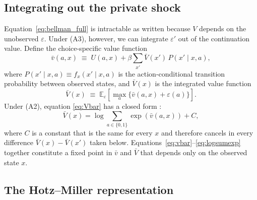 \documentclass{article}
\begin{document}
\subsection{Integrating out the private shock}

Equation~\eqref{eq:bellman_full} is intractable as written because $V$ depends on
the unobserved $\varepsilon$. Under (A3), however, we can integrate
$\varepsilon'$ out of the continuation value. Define the choice-specific value
function
\begin{equation}
\bar v(a, x) \;\equiv\; U(a, x) + \beta \sum_{x'} \bar V(x') \, P(x' \mid x, a),
\label{eq:vbar}
\end{equation}
where $P(x' \mid x, a) \equiv f_x(x' \mid x, a)$ is the action-conditional
transition probability between observed states, and $\bar V(x)$ is the integrated value function
\begin{equation}
\bar V(x) \;\equiv\; \mathbb{E}_\varepsilon \!\left[ \max_{a}
\big\{ \bar v(a, x) + \varepsilon(a) \big\} \right].
\label{eq:Vbar}
\end{equation}
Under (A2), equation \eqref{eq:Vbar} has a closed form \cite{train2009discrete}:
\begin{equation}
\bar V(x) = \log \!\sum_{a \in \{0,1\}} \exp\!\left( \bar v(a, x) \right) + C,
\label{eq:logsumexp}
\end{equation}
where $C$ is a constant that is the same for every $x$ and therefore cancels in every
difference $\bar V(x) - \bar V(x')$ taken below.
Equations~\eqref{eq:vbar}--\eqref{eq:logsumexp} together constitute a fixed
point in $\bar v$ and $\bar V$ that depends only on the observed state $x$.

\subsection{The Hotz--Miller representation}
\end{document}
